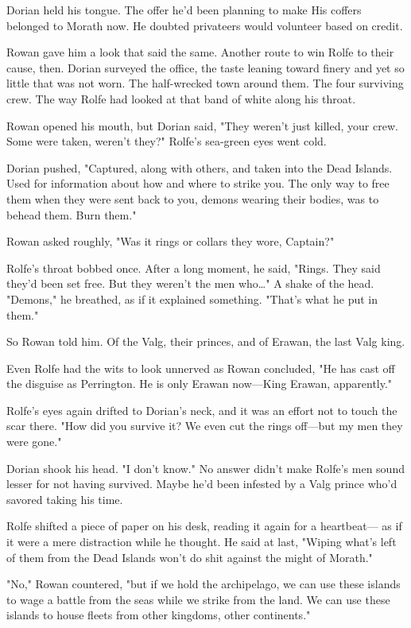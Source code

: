 Dorian held his tongue. The offer he'd been planning to make 
His coffers belonged to Morath now. He doubted privateers would volunteer based on credit.

Rowan gave him a look that said the same. Another route to win Rolfe to their cause, then. Dorian surveyed the office, the taste leaning toward finery and yet so little that was not worn. The half-wrecked town around them. The four surviving crew. The way Rolfe had looked at that band of white along his throat.

Rowan opened his mouth, but Dorian said, "They weren't just killed, your crew. Some were taken, weren't they?" Rolfe's sea-green eyes went cold.

Dorian pushed, "Captured, along with others, and taken into the Dead Islands. Used for information about how and where to strike you. The only way to free them when they were sent back to you, demons wearing their bodies, was to behead them. Burn them."

Rowan asked roughly, "Was it rings or collars they wore, Captain?"

Rolfe's throat bobbed once. After a long moment, he said, "Rings. They said they'd been set free. But they weren't the men who\ldots" A shake of the head. "Demons," he breathed, as if it explained something. "That's what he put in them."

So Rowan told him. Of the Valg, their princes, and of Erawan, the last Valg king.

Even Rolfe had the wits to look unnerved as Rowan concluded, "He has cast off the disguise as Perrington. He is only Erawan now---King Erawan, apparently."

Rolfe's eyes again drifted to Dorian's neck, and it was an effort not to touch the scar there. "How did you survive it? We even cut the rings off---but my men  they were gone."

Dorian shook his head. "I don't know." No answer didn't make Rolfe's men sound  lesser for not having survived. Maybe he'd been infested by a Valg prince who'd savored taking his time.

Rolfe shifted a piece of paper on his desk, reading it again for a heartbeat--- as if it were a mere distraction while he thought. He said at last, "Wiping what's left of them from the Dead Islands won't do shit against the might of Morath."

"No," Rowan countered, "but if we hold the archipelago, we can use these islands to wage a battle from the seas while we strike from the land. We can use these islands to house fleets from other kingdoms, other continents."

